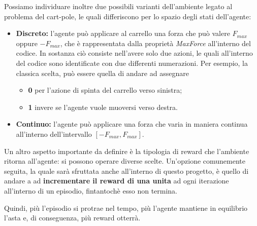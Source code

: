 Possiamo individuare inoltre due possibili varianti dell'ambiente legato al problema del cart-pole, le quali differiscono per lo spazio degli stati dell'agente:
\begin{itemize}
	\item \textbf{Discreto:} l'agente può applicare al carrello una forza che può valere \textbf{$F_{max}$} oppure \textbf{$-F_{max}$}, che è rappresentata dalla proprietà \textit{MaxForce} all'interno del codice. In sostanza ciò consiste nell'avere solo due azioni, le quali all'interno del codice sono identificate con due differenti numerazioni. Per esempio, la classica scelta, può essere quella di andare ad assegnare
	\begin{itemize}
		\item  \textbf{0} per l'azione di spinta del carrello verso sinistra;
		\item  \textbf{1} invere se l'agente vuole muoversi verso destra.
	\end{itemize}
	\item \textbf{Continuo:} l'agente può applicare una forza che varia in maniera continua all'interno dell'intervallo $[-F_{max}, F_{max}]$.
\end{itemize}

Un altro aspetto importante da definire è la tipologia di reward che l'ambiente ritorna all'agente: si possono operare diverse scelte. Un'opzione comunemente seguita, la quale sarà sfruttata anche all'interno di questo progetto, è quello di andare a ad \textbf{incrementare il reward di una unita} ad ogni iterazione all'interno di un episodio, fintantochè esso non termina. 

Quindi, più l'episodio si protrae nel tempo, più l'agente mantiene in equilibrio l'asta e, di conseguenza, più reward otterrà.